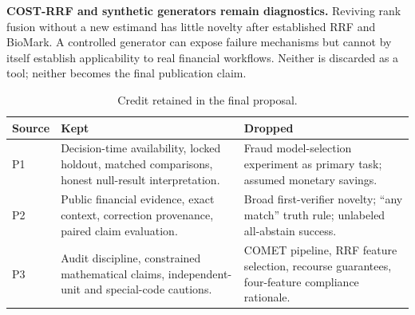 \documentclass[11pt,a4paper]{article}
\newcommand{\pbreak}{\clearpage}
\newcommand{\lead}[1]{\textbf{\color{navy}#1}}
\begin{document}
\lead{COST-RRF and synthetic generators remain diagnostics.} Reviving rank fusion without a new estimand has little novelty after established RRF and BioMark. A controlled generator can expose failure mechanisms but cannot by itself establish applicability to real financial workflows. Neither is discarded as a tool; neither becomes the final publication claim.

\begin{table}[H]\caption{Credit retained in the final proposal.}
\small\begin{tabularx}{\linewidth}{p{.10\linewidth}YY}\toprule
Source & Kept & Dropped\\\midrule
P1 & Decision-time availability, locked holdout, matched comparisons, honest null-result interpretation. & Fraud model-selection experiment as primary task; assumed monetary savings.\\
P2 & Public financial evidence, exact context, correction provenance, paired claim evaluation. & Broad first-verifier novelty; “any match” truth rule; unlabeled all-abstain success.\\
P3 & Audit discipline, constrained mathematical claims, independent-unit and special-code cautions. & COMET pipeline, RRF feature selection, recourse guarantees, four-feature compliance rationale.\\\bottomrule
\end{tabularx}\end{table}

\pbreak
\end{document}
